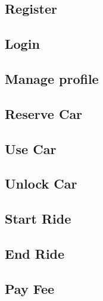 \subsection{Register}


\subsection{Login}


\subsection{Manage profile}


\subsection{Reserve Car}


\subsection{Use Car}


\subsection{Unlock Car} \label{unlock_car_section}


\subsection{Start Ride} \label{start_ride_section}


\subsection{End Ride} \label{end_ride_section}


\subsection{Pay Fee}
